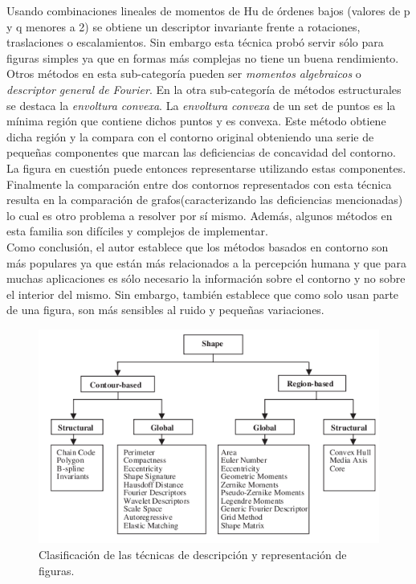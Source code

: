 Usando combinaciones lineales de momentos de Hu de \'ordenes bajos 
(valores de p y q menores a 2) se obtiene un descriptor 
invariante frente a rotaciones, traslaciones o escalamientos. Sin 
embargo esta t\'ecnica prob\'o servir s\'olo 
para figuras simples ya que en formas m\'as complejas no tiene un buena 
rendimiento. Otros m\'etodos en esta
sub-categor\'ia pueden ser \textit{momentos algebraicos} o \textit{descriptor general de Fourier}. En la otra sub-categor\'ia de m\'etodos
estructurales se destaca la \textit{envoltura convexa}. La 
\textit{envoltura convexa} de un set de puntos es la m\'inima regi\'on que contiene 
dichos puntos y es convexa. Este m\'etodo obtiene dicha regi\'on y la compara con el contorno original obteniendo una serie de peque\~nas
componentes que marcan las deficiencias de concavidad del contorno. La 
figura en cuesti\'on puede entonces representarse utilizando estas componentes.
Finalmente la comparaci\'on entre dos contornos representados con esta 
t\'ecnica resulta en la comparaci\'on de grafos(caracterizando las 
deficiencias mencionadas) lo cual es otro
problema a resolver por s\'i mismo. Adem\'as, algunos m\'etodos en esta familia son dif\'iciles y complejos de implementar.\\
\indent Como conclusi\'on, el autor establece que los m\'etodos basados en contorno son m\'as populares ya que est\'an m\'as relacionados
a la percepci\'on humana y que para muchas aplicaciones es s\'olo necesario la informaci\'on sobre el contorno y no sobre el interior del mismo.
Sin embargo, tambi\'en establece que como solo usan parte de una figura, son m\'as sensibles al ruido y peque\~nas variaciones.

\begin{figure}[tpb]
\begin{center}
  \includegraphics[scale=0.55]{vision/figures/shapess.png}
\end{center}
  \caption[T\'ecnicas de descripci\'on de figuras]
  {Clasificaci\'on de las t\'ecnicas de descripci\'on y representaci\'on de figuras.\cite{Zhang02}}
  \label{fig:review_shape}
\end{figure}


